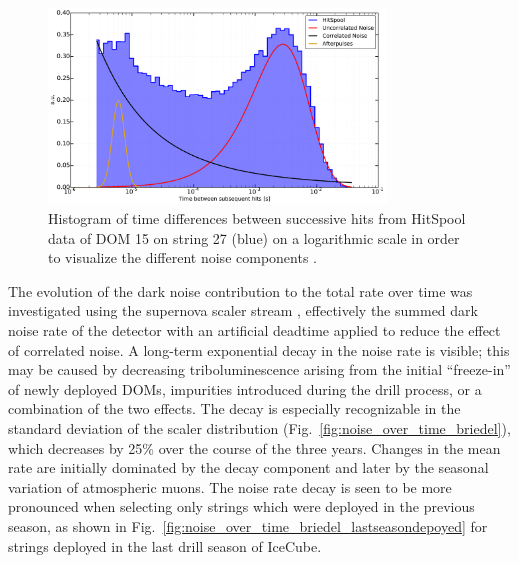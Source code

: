 \begin{figure}[!h]
 \centering
  \includegraphics[width=0.8\textwidth]{graphics/dom/performance/darknoise/SingleDOM_HitSpool_Hits_deltaT_fits_example.pdf}
 \caption{Histogram of time differences between successive hits from HitSpool data of
DOM 15 on string 27 (blue) on a logarithmic scale in order to visualize the
different noise components \cite{heereman2015hitspooling}.}
 \label{fig:darknoise_deltaT_components}
\end{figure}

The evolution of the dark noise contribution to the total rate over time was investigated using the
supernova scaler stream \cite{IC3:supernova, briedel_phd}, effectively 
the summed dark noise rate of the detector with an artificial deadtime
applied to reduce the effect of correlated noise. A long-term exponential decay in
the noise rate is visible; this may be caused by 
decreasing triboluminescence arising from the initial ``freeze-in''
of newly deployed DOMs, impurities introduced during the drill
process, or a combination of the two effects.  The decay
is especially recognizable in the standard deviation of the scaler
distribution (Fig.~\ref{fig:noise_over_time_briedel}), which decreases by
25\% over the course of the three years. Changes in the mean rate are
initially dominated by the decay component and later by the seasonal
variation of atmospheric muons. The noise
rate decay is seen to be more pronounced when selecting only strings
which were deployed in the previous season, as shown in Fig.~\ref{fig:noise_over_time_briedel_lastseasondepoyed} for strings deployed in the last drill season of IceCube.


